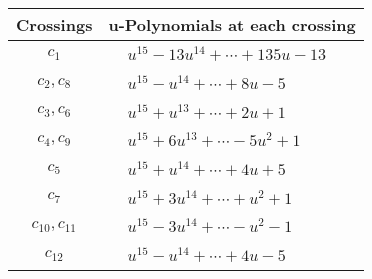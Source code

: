 \documentclass[1p]{elsarticle_modified}
\theoremstyle{definition}
\begin{document}
\begin{tabular}{m{50pt}|m{274pt}}
Crossings & \hspace{64pt}u-Polynomials at each crossing \\
\hline $$\begin{aligned}c_{1}\end{aligned}$$&$\begin{aligned}
&u^{15}-13 u^{14}+\cdots+135 u-13
\end{aligned}$\\
\hline $$\begin{aligned}c_{2},c_{8}\end{aligned}$$&$\begin{aligned}
&u^{15}- u^{14}+\cdots+8 u-5
\end{aligned}$\\
\hline $$\begin{aligned}c_{3},c_{6}\end{aligned}$$&$\begin{aligned}
&u^{15}+u^{13}+\cdots+2 u+1
\end{aligned}$\\
\hline $$\begin{aligned}c_{4},c_{9}\end{aligned}$$&$\begin{aligned}
&u^{15}+6 u^{13}+\cdots-5 u^2+1
\end{aligned}$\\
\hline $$\begin{aligned}c_{5}\end{aligned}$$&$\begin{aligned}
&u^{15}+u^{14}+\cdots+4 u+5
\end{aligned}$\\
\hline $$\begin{aligned}c_{7}\end{aligned}$$&$\begin{aligned}
&u^{15}+3 u^{14}+\cdots+u^2+1
\end{aligned}$\\
\hline $$\begin{aligned}c_{10},c_{11}\end{aligned}$$&$\begin{aligned}
&u^{15}-3 u^{14}+\cdots- u^2-1
\end{aligned}$\\
\hline $$\begin{aligned}c_{12}\end{aligned}$$&$\begin{aligned}
&u^{15}- u^{14}+\cdots+4 u-5
\end{aligned}$\\
\hline
\end{tabular}\\~\\
\end{document}
